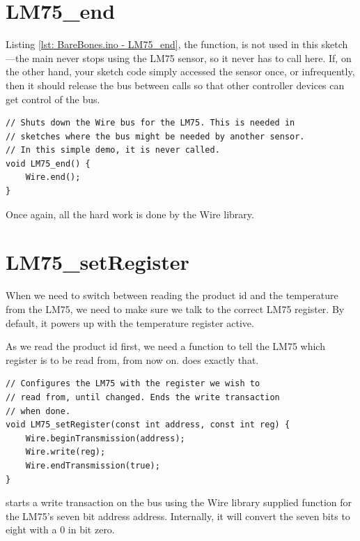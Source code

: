 \section{LM75\_end}

Listing \ref{lst: BareBones.ino - LM75_end}, the  function, is not used in this sketch---the main  never stops using the LM75 sensor, so it never has to call here. If, on the other hand, your sketch code simply accessed the sensor once, or infrequently, then it should release the \twi{} bus between calls so that other \twi{} controller devices can get control of the bus.

\begin{lstlisting}[caption={BareBones.ino - LM75\_end.},label={lst: BareBones.ino - LM75_end}, style=myArduino, firstnumber=88]
// Shuts down the Wire bus for the LM75. This is needed in
// sketches where the bus might be needed by another sensor.
// In this simple demo, it is never called.
void LM75_end() {
    Wire.end();
}
\end{lstlisting}

Once again, all the hard work is done by the Wire library.


\section{LM75\_setRegister}

When we need to switch between reading the product id and the temperature from the LM75, we need to make sure we talk to the correct LM75 register. By default, it powers up with the temperature register active.

As we read the product id first, we need a function to tell the LM75 which register is to be read from, from now on.  does exactly that.

\begin{lstlisting}[caption={BareBones.ino - LM75\_setRegister.},label={lst: BareBones.ino - LM75_setRegister}, style=myArduino, firstnumber=96]
// Configures the LM75 with the register we wish to
// read from, until changed. Ends the write transaction
// when done.
void LM75_setRegister(const int address, const int reg) {
    Wire.beginTransmission(address);
    Wire.write(reg);
    Wire.endTransmission(true);
}
\end{lstlisting}

 starts a write transaction on the \twi{} bus using the Wire library supplied  function for the LM75's seven bit address address. Internally, it will convert the seven bits to eight with a 0 in  bit zero.

